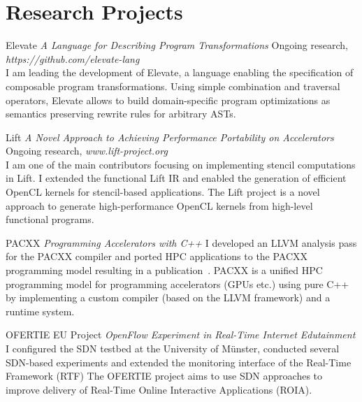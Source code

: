 \documentclass[11pt,a4paper]{moderncv}
\begin{document}
\section{Research Projects}
    \cventry{}
                    {}{}{}{}{}

					{Elevate}
					{\textit{A Language for Describing Program Transformations}}{}{}
                    {Ongoing research, \textit{https://github.com/elevate-lang}\\
					 I am leading the development of Elevate, a language enabling the specification of composable program transformations.
                     Using simple combination and traversal operators, Elevate allows to build domain-specific program optimizations as semantics preserving rewrite rules for arbitrary ASTs.
					}



					{Lift}
					{\textit{A Novel Approach to Achieving Performance Portability on Accelerators}}{}{}
					{Ongoing research, \textit{www.lift-project.org}\\
					 I am one of the main contributors focusing on implementing stencil computations in Lift.
					 I extended the functional Lift IR and enabled the generation
					 of efficient OpenCL kernels for stencil-based applications.
					 The Lift project is a novel approach to generate high-performance OpenCL kernels
					 from high-level functional programs.\\
					}

					{PACXX}
					{\textit{Programming Accelerators with C++}}{}{}{
					 I developed an LLVM analysis pass for the PACXX compiler and ported HPC applications
					 to the PACXX programming model resulting in a publication~\cite{haidl}.
					 PACXX is a unified HPC programming model for programming accelerators
					 (GPUs etc.) using pure C++ by implementing a custom compiler
					 (based on the LLVM framework) and a runtime system.
					}

					{OFERTIE EU Project}
					{\textit{OpenFlow Experiment in Real-Time Internet Edutainment}}{}{}
					{
					 I configured the SDN
					 testbed at the University of Münster, conducted several SDN-based experiments
					 and extended the monitoring interface of the Real-Time Framework (RTF)
					 The OFERTIE project aims to use SDN approaches to improve delivery of Real-Time Online
					 Interactive Applications (ROIA).
					}
\end{document}
